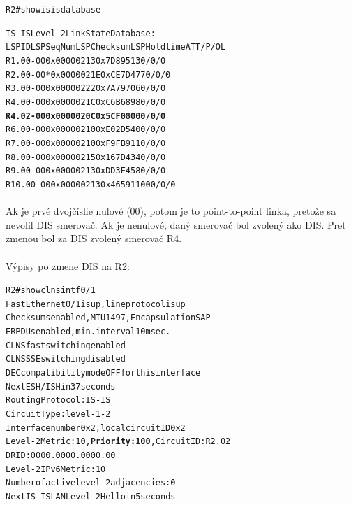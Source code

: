 \documentclass[12pt,twoside,a4paper]{report}
\begin{document}
\noindent
{\selectfont
\begin{small}
\begin{alltt}

R2#show isis database

IS-IS Level-2 Link State Database:
LSPID                 LSP Seq Num  LSP Checksum  LSP Holdtime      ATT/P/OL
R1.00-00              0x00000213   0x7D89        513               0/0/0
R2.00-00            * 0x0000021E   0xCE7D        477               0/0/0
R3.00-00              0x00000222   0x7A79        706               0/0/0
R4.00-00              0x0000021C   0xC6B6        898               0/0/0
\textbf{R4.02-00              0x0000020C   0x5CF0        800               0/0/0}
R6.00-00              0x00000210   0xE02D        540               0/0/0
R7.00-00              0x00000210   0xF9FB        911               0/0/0
R8.00-00              0x00000215   0x167D        434               0/0/0
R9.00-00              0x00000213   0xDD3E        458               0/0/0
R10.00-00             0x00000213   0x4659        1100              0/0/0

\end{alltt}
\end{small}
}

\paragraph{}
Ak je prvé dvojčíslie nulové (00), potom je to point-to-point linka, pretože sa nevolil DIS smerovač. Ak je nenulové, daný smerovač bol zvolený ako DIS. Pret zmenou bol za DIS zvolený smerovač R4.


\paragraph{}
Výpisy po zmene DIS na R2:

\noindent
{\selectfont
\begin{small}
\begin{alltt}

R2#show clns int f0/1
FastEthernet0/1 is up, line protocol is up
  Checksums enabled, MTU 1497, Encapsulation SAP
  ERPDUs enabled, min. interval 10 msec.
  CLNS fast switching enabled
  CLNS SSE switching disabled
  DEC compatibility mode OFF for this interface
  Next ESH/ISH in 37 seconds
  Routing Protocol: IS-IS
    Circuit Type: level-1-2
    Interface number 0x2, local circuit ID 0x2
    Level-2 Metric: 10, \textbf{Priority: 100}, Circuit ID: R2.02
    DR ID: 0000.0000.0000.00
    Level-2 IPv6 Metric: 10
    Number of active level-2 adjacencies: 0
    Next IS-IS LAN Level-2 Hello in 5 seconds

\end{alltt}
\end{small}
}
\end{document}

